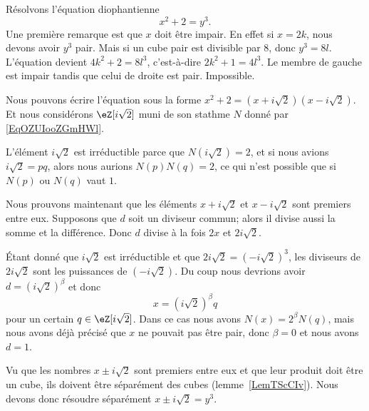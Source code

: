 \begin{example}     \label{ExmuQisZU}
    Résolvons l'équation diophantienne
    \begin{equation}
        x^2+2=y^3.
    \end{equation}
    Une première remarque est que \( x\) doit être impair. En effet si \( x=2k\), nous devons avoir \( y^3\) pair. Mais si un cube pair est divisible par \( 8\), donc \( y^3=8l\). L'équation devient \( 4k^2+2=8l^3\), c'est-à-dire \( 2k^2+1=4l^3\). Le membre de gauche est impair tandis que celui de droite est pair. Impossible.

    Nous pouvons écrire l'équation sous la forme \( x^2+2=(x+i\sqrt{2})(x-i\sqrt{2})\). Et nous considérons \( \eZ[i\sqrt{2}]\) muni de son stathme \( N\) donné par \eqref{EqOZUIooZGmHWl}.

    L'élément \( i\sqrt{2}\) est irréductible parce que \( N(i\sqrt{2})=2\), et si nous avions \( i\sqrt{2}=pq\), alors nous aurions \( N(p)N(q)=2\), ce qui n'est possible que si \( N(p)\) ou \( N(q)\) vaut \( 1\).

    Nous prouvons maintenant que les éléments \( x+i\sqrt{2}\) et \( x-i\sqrt{2}\) sont premiers entre eux. Supposons que \( d\) soit un diviseur commun; alors il divise aussi la somme et la différence. Donc \( d\) divise à la fois \( 2x\) et \( 2i\sqrt{2}\).

    Étant donné que \( i\sqrt{2}\) est irréductible et que \( 2i\sqrt{2}=(-i\sqrt{2})^3\), les diviseurs de \( 2i\sqrt{2}\) sont les puissances de \( (-i\sqrt{2})\). Du coup nous devrions avoir \( d=(i\sqrt{2})^{\beta}\) et donc
    \begin{equation}
        x=(i\sqrt{2})^{\beta}q
    \end{equation}
    pour un certain \( q\in\eZ[i\sqrt{2}]\). Dans ce cas nous avons \( N(x)=2^{\beta}N(q)\), mais nous avons déjà précisé que \( x\) ne pouvait pas être pair, donc \( \beta=0\) et nous avons \( d=1\).

    Vu que les nombres \( x\pm i\sqrt{2}\) sont premiers entre eux et que leur produit doit être un cube, ils doivent être séparément des cubes (lemme~\ref{LemTScCIv}). Nous devons donc résoudre séparément \( x\pm i\sqrt{2}=y^3\).


\end{example}
